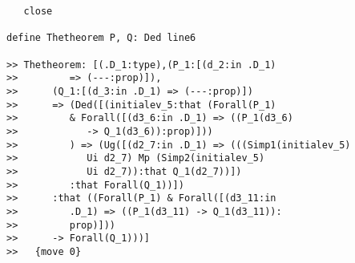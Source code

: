 \documentclass{slides}
\begin{document}
\begin{slide}
\begin{verbatim}
   close

define Thetheorem P, Q: Ded line6

>> Thetheorem: [(.D_1:type),(P_1:[(d_2:in .D_1)
>>         => (---:prop)]),
>>      (Q_1:[(d_3:in .D_1) => (---:prop)])
>>      => (Ded([(initialev_5:that (Forall(P_1)
>>         & Forall([(d3_6:in .D_1) => ((P_1(d3_6)
>>            -> Q_1(d3_6)):prop)]))
>>         ) => (Ug([(d2_7:in .D_1) => (((Simp1(initialev_5)
>>            Ui d2_7) Mp (Simp2(initialev_5)
>>            Ui d2_7)):that Q_1(d2_7))])
>>         :that Forall(Q_1))])
>>      :that ((Forall(P_1) & Forall([(d3_11:in
>>         .D_1) => ((P_1(d3_11) -> Q_1(d3_11)):
>>         prop)]))
>>      -> Forall(Q_1)))]
>>   {move 0}


\end{verbatim}

\end{slide}
\end{document}
